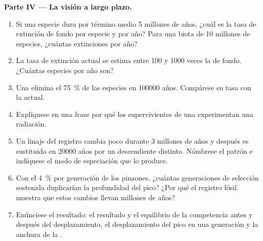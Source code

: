 \begin{problem}
\medskip
\noindent\textbf{Parte IV --- La visión a largo plazo.}
\begin{enumerate}[resume]
  \item Si una especie dura por término medio 5 millones de años, ¿cuál es
        la tasa de extinción de fondo por especie y por año? Para una
        biota de 10 millones de especies, ¿cuántas extinciones por año?
  \item La tasa de extinción actual se estima entre 100 y 1000 veces la de
        fondo. ¿Cuántas especies por año son?
  \item Una  elimina el \qty{75}{\%} de las especies en
        \num{100000} años. Compárese su tasa con la actual.
  \item Explíquese en una frase por qué los supervivientes de una
         experimentan una radiación.
  \item Un linaje del registro cambia poco durante 3 millones de años y
        después es sustituido en \num{20000} años por un descendiente
        distinto. Nómbrese el patrón e indíquese el modo de especiación
        que lo produce.
  \item Con el \qty{4}{\%} por generación de los pinzones, ¿cuántas
        generaciones de selección sostenida duplicarían la profundidad del
        pico? ¿Por qué el registro fósil muestra que estos cambios llevan
        millones de años?
  \item Enúnciese el resultado: el resultado y el equilibrio de la
        competencia antes y después del desplazamiento, el desplazamiento
        del pico en una generación y la anchura de la .
\end{enumerate}
\end{problem}
